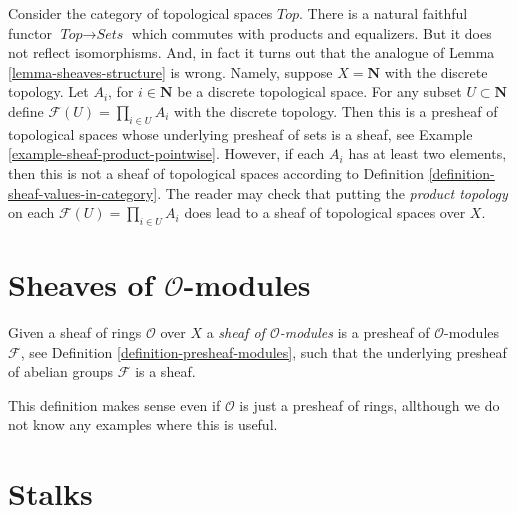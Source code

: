 \begin{example}
\label{example-sheaves-topological-spaces}
Consider the category of topological spaces $\textit{Top}$.
There is a natural faithful functor $\textit{Top} \to \textit{Sets}$
which commutes with products and equalizers. But it does
not reflect isomorphisms. And, in fact it turns out that
the analogue of Lemma \ref{lemma-sheaves-structure} is wrong.
Namely, suppose $X = \mathbf{N}$ with the discrete
topology. Let $A_i$, for $i \in \mathbf{N}$ be a discrete
topological space. For any subset $U \subset \mathbf{N}$
define $\mathcal{F}(U) = \prod_{i\in U} A_i$ with the
discrete topology. Then this is a presheaf of topological
spaces whose underlying presheaf of sets is a sheaf, see
Example \ref{example-sheaf-product-pointwise}.
However, if each $A_i$ has at least two elements, then
this is not a sheaf of topological spaces
according to Definition \ref{definition-sheaf-values-in-category}.
The reader may check that putting the {\it product topology} on
each $\mathcal{F}(U) = \prod_{i\in U} A_i$ does lead to a sheaf
of topological spaces over $X$.
\end{example}


\section{Sheaves of $\mathcal{O}$-modules}
\label{section-sheaves-modules}

\begin{definition}
\label{definition-sheaf-modules}
Given a sheaf of rings $\mathcal{O}$ over $X$
a {\it sheaf of $\mathcal{O}$-modules} is a presheaf
of $\mathcal{O}$-modules $\mathcal{F}$,
see Definition \ref{definition-presheaf-modules},
such that the underlying presheaf of abelian groups $\mathcal{F}$
is a sheaf.
\end{definition}

\noindent
This definition makes sense even if $\mathcal{O}$ is just a
presheaf of rings, allthough we do not know any examples where
this is useful.







\section{Stalks}
\label{section-stalks}

